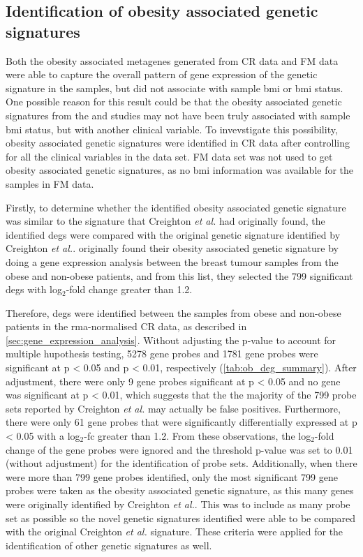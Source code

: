 \subsection{Identification of obesity associated genetic signatures}
\label{sub:identification_of_obesity_associated_genetic_signatures}

Both the obesity associated metagenes generated from CR data and FM data were able to capture the overall pattern of gene expression of the genetic signature in the samples, but did not associate with sample \gls{bmi} or \gls{bmi} status.
One possible reason for this result could be that the obesity associated genetic signatures from the \citet{Creighton2012} and \citet{Fuente-Mattei2014} studies may not have been truly associated with sample \gls{bmi}  status, but with another clinical variable.
To invevstigate this possibility, obesity associated genetic signatures were identified in CR data after controlling for all the clinical variables in the data set.
FM data set was not used to get obesity associated genetic signatures, as no \gls{bmi} information was available for the samples in FM data.

Firstly, to determine whether the identified obesity associated genetic signature was similar to the signature that Creighton \textit{et al.} had originally found, the identified \glspl{deg} were compared with the original genetic signature identified by Creighton \textit{et al.}.
\citet{Creighton2012} originally found their obesity associated genetic signature by doing a gene expression analysis between the breast tumour samples from the obese and non-obese patients, and from this list, they selected the 799 significant \glspl{deg} with log$_2$-fold change greater than 1.2.

Therefore, \glspl{deg}  were identified between the samples from obese and non-obese patients in the \gls{rma}-normalised CR data, as described in \cref{sec:gene_expression_analysis}.
Without adjusting the p-value to account for multiple hupothesis testing, 5278 gene probes and 1781 gene probes were significant at p \textless{} 0.05 and p \textless{} 0.01, respectively (\cref{tab:ob_deg_summary}).
After adjustment, there were only 9 gene probes significant at p \textless{} 0.05 and no gene was significant at p \textless{} 0.01, which suggests that the the majority of the 799 probe sets reported by Creighton \textit{et al.} may actually be false positives.
Furthermore, there were only 61 gene probes that were significantly differentially expressed at p \textless{} 0.05 with a log$_2$-\gls{fc} greater than 1.2.
From these observations, the log$_2$-fold change of the gene probes were ignored and the threshold p-value was set to 0.01 (without adjustment) for the identification of probe sets.
Additionally, when there were more than 799 gene probes identified, only the most significant 799 gene probes were taken as the obesity associated genetic signature, as this many genes were originally identified by Creighton \textit{et al.}.
This was to include as many probe set as possible so the novel genetic signatures identified were able to be compared with the original Creighton \textit{et al.} signature.
These criteria were applied for the identification of other genetic signatures as well.

